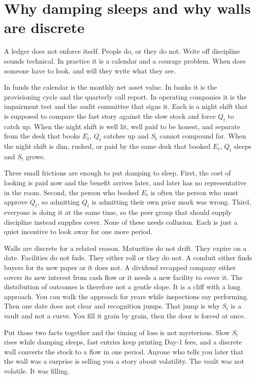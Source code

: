 \section{Why damping sleeps and why walls are discrete}

A ledger does not enforce itself. People do, or they do not. Write off discipline sounds technical. In practice it is a calendar and a courage problem. When does someone have to look, and will they write what they see.

In funds the calendar is the monthly net asset value. In banks it is the provisioning cycle and the quarterly call report. In operating companies it is the impairment test and the audit committee that signs it. Each is a night shift that is supposed to compare the fast story against the slow stock and force $Q_t$ to catch up. When the night shift is well lit, well paid to be honest, and separate from the desk that books $E_t$, $Q_t$ catches up and $S_t$ cannot compound far. When the night shift is dim, rushed, or paid by the same desk that booked $E_t$, $Q_t$ sleeps and $S_t$ grows.

Three small frictions are enough to put damping to sleep. First, the cost of looking is paid now and the benefit arrives later, and later has no representative in the room. Second, the person who booked $E_t$ is often the person who must approve $Q_t$, so admitting $Q_t$ is admitting their own prior mark was wrong. Third, everyone is doing it at the same time, so the peer group that should supply discipline instead supplies cover. None of these needs collusion. Each is just a quiet incentive to look away for one more period.

Walls are discrete for a related reason. Maturities do not drift. They expire on a date. Facilities do not fade. They either roll or they do not. A conduit either finds buyers for its new paper or it does not. A dividend recapped company either covers its new interest from cash flow or it needs a new facility to cover it. The distribution of outcomes is therefore not a gentle slope. It is a cliff with a long approach. You can walk the approach for years while inspections say performing. Then one date does not clear and recognition jumps. That jump is why $S_t$ is a vault and not a curve. You fill it grain by grain, then the door is forced at once.

Put those two facts together and the timing of loss is not mysterious. Slow $S_t$ rises while damping sleeps, fast entries keep printing Day-1 fees, and a discrete wall converts the stock to a flow in one period. Anyone who tells you later that the wall was a surprise is selling you a story about volatility. The vault was not volatile. It was filling.

